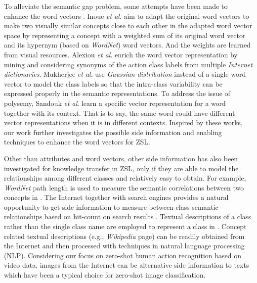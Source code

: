 \documentclass[runningheads,a4paper] {llncs}
\begin{document}
To alleviate the semantic gap problem, some attempts have been made to enhance the word vectors \cite{inoue2016adaptation,alexiou2016exploring,mukherjee2016gaussian,sandouk2016multi}.  Inoue \textit{et al}. \cite{inoue2016adaptation} aim to adapt the original word vectors to make two visually similar concepts close to each other in the adapted word vector space by representing a concept with a weighted sum of its original word vector and its hypernym (based on \textit{WordNet}) word vectors. And the weights are learned from visual resources. Alexiou \textit{et al}. \cite{alexiou2016exploring} enrich the word vector representation by mining and considering synonyms of the action class labels from multiple \textit{Internet dictionaries}.  Mukherjee \textit{et al}. \cite{mukherjee2016gaussian} use \textit{Gaussian distribution} instead of a single word vector to model the class labels so that the intra-class variability can be expressed properly in the semantic representations. To address the issue of polysemy, Sandouk \textit{et al}. \cite{sandouk2016multi} learn a specific vector representation for a word together with its context. That is to say, the same word could have different vector representations when it is in different contexts. Inspired by these works, our work further investigates the possible side information and enabling techniques to enhance the word vectors for ZSL.

Other than attributes and word vectors, other side information has also been investigated for knowledge transfer in ZSL, only if they are able to model the relationships among different classes and relatively easy to obtain. For example, \textit{WordNet} path length is used to measure the semantic correlations between two concepts in \cite{chuang2015exploring,rohrbach2010helps}. The Internet together with search engines provides a natural opportunity to get side information to measure between-class semantic relationships based on hit-count on search results \cite{rohrbach2010helps}. Textual descriptions of a class rather than the single class name are employed to represent a class in \cite{elhoseiny2013write,akata2016multi}. Concept related textual descriptions (e.g., \textit{Wikipedia} page) can be readily obtained from the Internet and then processed with techniques in natural language processing (NLP). Considering our focus on zero-shot human action recognition based on video data, images from the Internet can be alternative side information to texts which have been a typical choice for zero-shot image classification.
\end{document}
